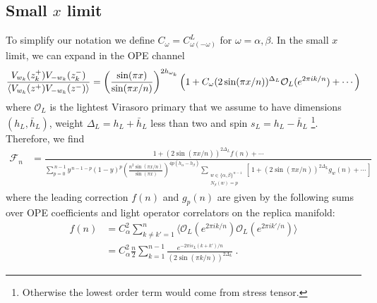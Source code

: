 \documentclass[11pt]{article}
\newcommand{\mO}{\mathcal{O}}
\newcommand{\nn}{\nonumber}
\newcommand{\lb}{\left(}
\newcommand{\rb}{\right)}
\begin{document}

  \subsection*{Small $x$ limit}

  To simplify our notation we define $C_{\omega}=C^{L}_{\omega(-\omega)}$ for
  $\omega=\alpha,\beta$. In the small $x$ limit, we can expand in the OPE
  channel
  \begin{eqnarray}
    \frac{V_{w_k}(z_{k}^{+})V_{-w_k}(z_{k}^{-})}{\braket{V_{w_k}(z^+)V_{-w_k}(z^-)}}=\lb
    \frac{\sin(\pi x)}{\sin(\pi x/n)}\rb^{2h_{\omega_k}}\lb 1+ C_\omega(2\sin(\pi
    x/n))^{\Delta_L}\mO_L(e^{2\pi i k/n})+\cdots\rb\nn
  \end{eqnarray}
  where $\mO_{L}$ is the lightest Virasoro primary that we assume to have
  dimensions $(h_{L},\bar{h}_{L})$, weight $\Delta_{L}=h_{L}+\bar{h}_{L}$ less than
  two and spin $s_{L}=h_{L}-\bar{h}_{L}$ \footnote{Otherwise the lowest order
  term would come from stress tensor.}. Therefore, we find
  \begin{align}
    \label{eq:F_n}\mathcal{F}_{n} & =\frac{\,1+(2\sin(\pi x/n))^{2\Delta_L}f(n)+\cdots\,}{\displaystyle \sum_{p=0}^{\,n-1}y^{\,n-1-p}(1-y)^{p}\left(\frac{n^2\sin(\pi x/n)}{\sin(\pi x)}\right)^{4p(h_\alpha-h_\beta)}\sum_{\substack{w\in\{\alpha,\beta\}^{\,n-1}\\ N_\beta(w)=p}}\left[\,1+(2\sin(\pi x/n))^{2\Delta_L}g_{w}(n)+\cdots\,\right] }
  \end{align}
  where the leading correction $f(n)$ and $g_{p}(n)$ are given by the following sums
  over OPE coefficients and light operator correlators on the replica manifold:
  \begin{align}
    f(n) & =C_{\alpha}^{2}\sum_{k\neq k'=1}^{n}\langle \mO_{L}(e^{2\pi i k/n})\mO_{L}(e^{2\pi i k'/n})\rangle \nn    \\
         & =C_{\alpha}^{2}\frac{n}{2}\sum_{k=1}^{n-1}\frac{e^{-2\pi i s_L(k+k')/n}}{(2\sin(\pi k/n))^{2\Delta_L}}\ .
  \end{align}
\end{document}

